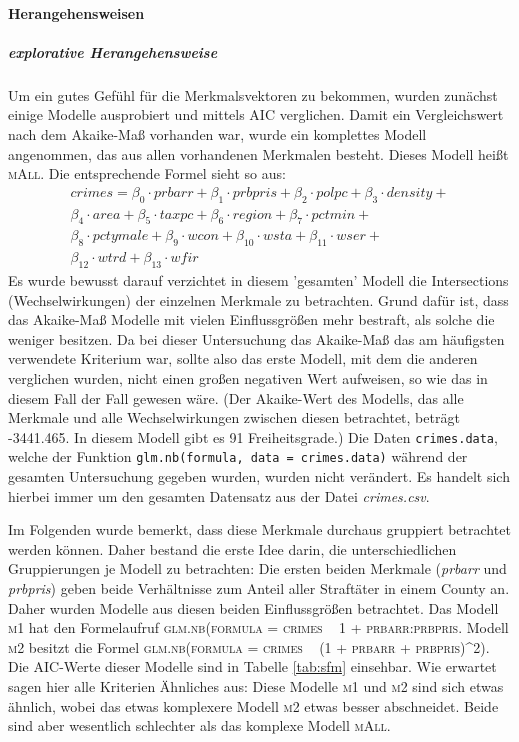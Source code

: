 \paragraph{Herangehensweisen}
\subparagraph{explorative Herangehensweise}
Um ein gutes Gef\"uhl f\"ur die Merkmalsvektoren zu bekommen, wurden zun\"achst einige Modelle ausprobiert und mittels AIC verglichen.
Damit ein Vergleichswert nach dem Akaike-Ma\ss{} vorhanden war, wurde ein komplettes Modell angenommen, das aus allen vorhandenen Merkmalen besteht. Dieses Modell hei\ss{}t \textsc{mAll}. Die entsprechende Formel sieht so aus:
\begin{equation}\begin{split}
crimes = 
\beta_0 \cdot prbarr+ \beta_1 \cdot prbpris + \beta_2  \cdot polpc +  \beta_3 \cdot density + \\
\beta_4 \cdot area + \beta_5 \cdot taxpc + \beta_6 \cdot region + \beta_7 \cdot pctmin + \\
\beta_8 \cdot pctymale + \beta_9 \cdot wcon + \beta_{10} \cdot wsta + \beta_{11} \cdot wser + \\
\beta_{12} \cdot wtrd + \beta_{13} \cdot wfir
\end{split}
\end{equation}
Es wurde bewusst darauf verzichtet in diesem 'gesamten' Modell die Intersections (Wechselwirkungen) der einzelnen Merkmale zu betrachten. Grund daf\"ur ist, dass das Akaike-Ma\ss{} Modelle mit vielen Einflussgr\"o\ss{}en mehr bestraft, als solche die weniger besitzen. Da bei dieser Untersuchung das Akaike-Ma\ss{} das am h\"aufigsten verwendete Kriterium war, sollte also das erste Modell, mit dem die anderen verglichen wurden, nicht einen gro\ss{}en negativen Wert aufweisen, so wie das in diesem Fall der Fall gewesen w\"are. (Der Akaike-Wert des Modells, das alle Merkmale und alle Wechselwirkungen zwischen diesen betrachtet, betr\"agt -3441.465. In diesem Modell gibt es 91 Freiheitsgrade.)
Die Daten \texttt{crimes.data}, welche der Funktion \texttt{glm.nb(formula, data = crimes.data)} w\"ahrend der gesamten Untersuchung gegeben wurden, wurden nicht ver\"andert. Es handelt sich hierbei immer um den gesamten Datensatz aus der Datei \textit{crimes.csv}.

Im Folgenden wurde bemerkt, dass diese Merkmale durchaus gruppiert betrachtet werden k\"onnen. Daher bestand die erste Idee darin, die unterschiedlichen Gruppierungen je Modell zu betrachten:
Die ersten beiden Merkmale (\textit{prbarr} und \textit{prbpris}) geben beide Verh\"altnisse zum Anteil aller Straft\"ater in einem County an. Daher wurden Modelle aus diesen beiden Einflussgr\"o\ss{}en betrachtet.
Das Modell \textsc{m1} hat den Formelaufruf \textsc{glm.nb(formula = crimes ~ 1 + prbarr:prbpris}.
Modell \textsc{m2} besitzt die Formel \textsc{glm.nb(formula = crimes ~ (1 + prbarr + prbpris)^2)}.
Die AIC-Werte dieser Modelle sind in Tabelle \ref{tab:sfm} einsehbar.
Wie erwartet sagen hier alle Kriterien \"Ahnliches aus:
Diese Modelle \textsc{m1} und \textsc{m2} sind sich etwas \"ahnlich, wobei das etwas komplexere Modell \textsc{m2} etwas besser abschneidet.
Beide sind aber wesentlich schlechter als das komplexe Modell \textsc{mAll}. 

